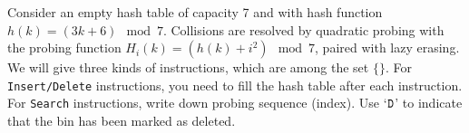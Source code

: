   Consider an empty hash table of capacity 7 and with hash function \(h(k) = (3k + 6) \mod 7\). Collisions are resolved by quadratic probing with the probing function \(H_i(k) = (h(k) + i^2)\mod 7\), paired with lazy erasing. We will give three kinds of instructions, which are among the set  $\{$$\}$. For \texttt{Insert/Delete} instructions, you need to fill the hash table after each instruction. For \texttt{Search} instructions, write down probing sequence (index). Use `\(\texttt{D}\)' to indicate that the bin has been marked as deleted.

